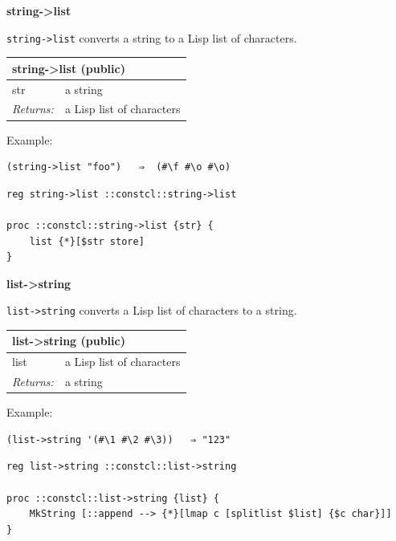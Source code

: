 \documentclass[twoside,9pt]{report}
\begin{document}
\textbf{string->list}


\texttt{string->list} converts a string to a Lisp list of characters.

\begin{tabular}{ |l l| }
\hline
\multicolumn{2}{|l|}{string->list (public)} \\
\hline
str & a string \\
\textit{Returns:} & a Lisp list of characters \\
\hline
\end{tabular}


Example:

\noindent\makebox[\linewidth]{\rule{\linewidth}{0.4pt}}
\begin{lstlisting}
(string->list "foo")   ⇒  (#\f #\o #\o)
\end{lstlisting}
\noindent\makebox[\linewidth]{\rule{\linewidth}{0.4pt}}
\noindent\makebox[\linewidth]{\rule{\linewidth}{0.4pt}}
\begin{lstlisting}
reg string->list ::constcl::string->list
 
proc ::constcl::string->list {str} {
    list {*}[$str store]
}
\end{lstlisting}
\noindent\makebox[\linewidth]{\rule{\linewidth}{0.4pt}}

\textbf{list->string}


\texttt{list->string} converts a Lisp list of characters to a string.

\begin{tabular}{ |l l| }
\hline
\multicolumn{2}{|l|}{list->string (public)} \\
\hline
list & a Lisp list of characters \\
\textit{Returns:} & a string \\
\hline
\end{tabular}


Example:

\noindent\makebox[\linewidth]{\rule{\linewidth}{0.4pt}}
\begin{lstlisting}
(list->string '(#\1 #\2 #\3))   ⇒ "123"
\end{lstlisting}
\noindent\makebox[\linewidth]{\rule{\linewidth}{0.4pt}}
\noindent\makebox[\linewidth]{\rule{\linewidth}{0.4pt}}
\begin{lstlisting}
reg list->string ::constcl::list->string
 
proc ::constcl::list->string {list} {
    MkString [::append --> {*}[lmap c [splitlist $list] {$c char}]]
}
\end{lstlisting}
\noindent\makebox[\linewidth]{\rule{\linewidth}{0.4pt}}
\end{document}
